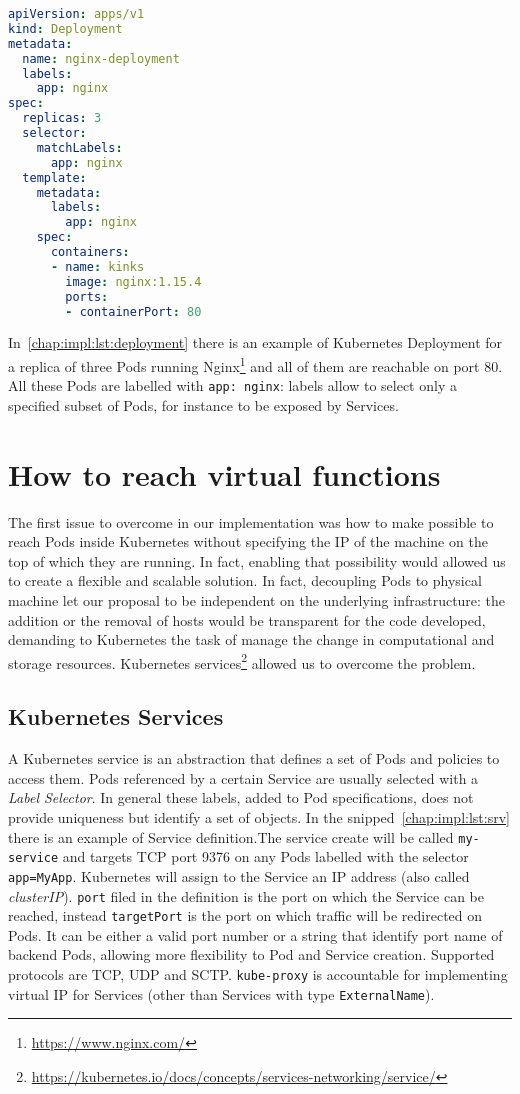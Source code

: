 \begin{lstlisting}[caption={Example of Deployment definition},
                   captionpos=b, language=yaml, label=chap:impl:lst:deployment]
apiVersion: apps/v1
kind: Deployment
metadata:
  name: nginx-deployment
  labels:
    app: nginx
spec:
  replicas: 3
  selector:
    matchLabels:
      app: nginx
  template:
    metadata:
      labels:
        app: nginx
    spec:
      containers:
      - name: kinks
        image: nginx:1.15.4
        ports:
        - containerPort: 80
\end{lstlisting}
In~\ref{chap:impl:lst:deployment} there is an example of Kubernetes Deployment
for a replica of three Pods running Nginx\footnote{\url{https://www.nginx.com/}}
and all of them are reachable on port $80$. All these Pods are labelled with
\texttt{app: nginx}: labels allow to select only a specified subset of Pods,
for instance to be exposed by Services.

\section{How to reach virtual functions}
The first issue to overcome in our implementation was how to make possible to
reach Pods inside Kubernetes without specifying the IP of the machine on the top
of which they are running. In fact, enabling that possibility would allowed us
to create a flexible and scalable solution. In fact, decoupling Pods to physical
machine let our proposal to be independent on the underlying infrastructure: the
addition or the removal of hosts would be transparent for the code developed,
demanding to Kubernetes the task of manage the change in computational and
storage resources. Kubernetes
services\footnote{\url{https://kubernetes.io/docs/concepts/services-networking/service/}}
allowed us to overcome the problem.

\subsection{Kubernetes Services}
A Kubernetes service is an abstraction that defines a set of Pods and policies
to access them. Pods referenced by a certain Service are usually selected with a
\emph{Label Selector}. In general these labels, added to Pod specifications,
does not provide uniqueness but identify a set of objects.
In the snipped~\ref{chap:impl:lst:srv} there is an example of Service
definition.The service create will be called \texttt{my-service} and targets TCP
port 9376 on any Pods labelled with the selector \texttt{app=MyApp}. Kubernetes
will assign to the Service an IP address (also called \emph{clusterIP}). 
\texttt{port} filed in the definition is the port on which the Service can be
reached, instead \texttt{targetPort} is the port on which traffic will be
redirected on Pods. It can be either a valid port number or a string that
identify port name of backend Pods, allowing more flexibility to Pod and Service
creation. Supported protocols are TCP, UDP and SCTP. \texttt{kube-proxy} is
accountable for implementing virtual IP for Services (other than Services with
type \texttt{ExternalName}). 

